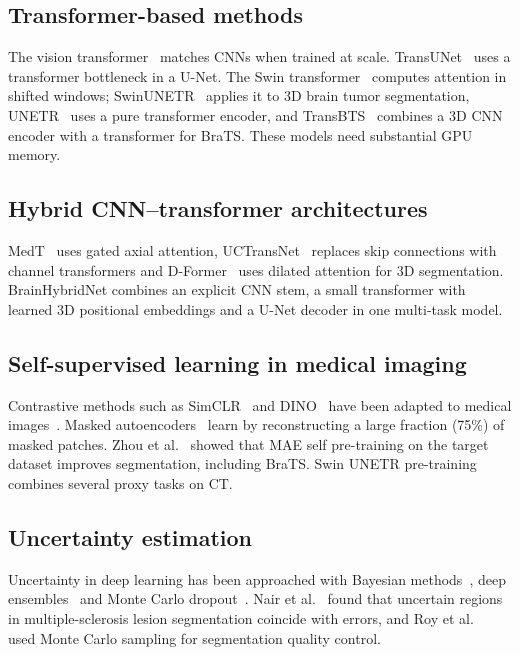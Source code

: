\documentclass[pdflatex,sn-mathphys-num]{sn-jnl}
\begin{document}
\subsection{Transformer-based methods}
The vision transformer~\cite{dosovitskiy2021} matches CNNs when trained at scale. TransUNet~\cite{chen2021transunet} uses a transformer bottleneck in a U-Net. The Swin transformer~\cite{liu2021swin} computes attention in shifted windows; SwinUNETR~\cite{tang2022swinunetr} applies it to 3D brain tumor segmentation, UNETR~\cite{hatamizadeh2022unetr} uses a pure transformer encoder, and TransBTS~\cite{wang2021transbts} combines a 3D CNN encoder with a transformer for BraTS. These models need substantial GPU memory.

\subsection{Hybrid CNN--transformer architectures}
MedT~\cite{valanarasu2021medt} uses gated axial attention, UCTransNet~\cite{wang2022uctransnet} replaces skip connections with channel transformers and D-Former~\cite{wu2023dformer} uses dilated attention for 3D segmentation. BrainHybridNet combines an explicit CNN stem, a small transformer with learned 3D positional embeddings and a U-Net decoder in one multi-task model.

\subsection{Self-supervised learning in medical imaging}
Contrastive methods such as SimCLR~\cite{chen2020simclr} and DINO~\cite{caron2021dino} have been adapted to medical images~\cite{sowrirajan2021mococxr}. Masked autoencoders~\cite{he2022mae} learn by reconstructing a large fraction (75\%) of masked patches. Zhou et al.~\cite{zhou2023selfmae} showed that MAE self pre-training on the target dataset improves segmentation, including BraTS. Swin UNETR pre-training~\cite{tang2022swinunetr} combines several proxy tasks on CT.

\subsection{Uncertainty estimation}
Uncertainty in deep learning has been approached with Bayesian methods~\cite{neal1996}, deep ensembles~\cite{lakshminarayanan2017} and Monte Carlo dropout~\cite{gal2016}. Nair et al.~\cite{nair2020} found that uncertain regions in multiple-sclerosis lesion segmentation coincide with errors, and Roy et al.~\cite{roy2018} used Monte Carlo sampling for segmentation quality control.
\end{document}
